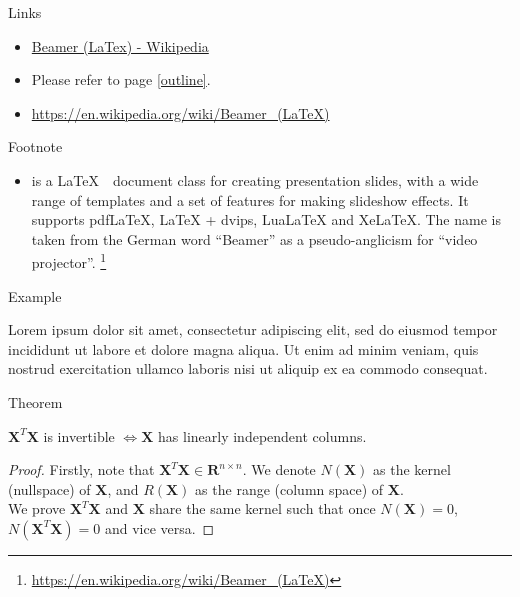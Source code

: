 \documentclass{beamer}
\begin{document}
\begin{frame}{Links}
    \begin{itemize}
        \item \href{https://en.wikipedia.org/wiki/Beamer_(LaTeX)}{Beamer (LaTex) - Wikipedia}
        \item Please refer to page \ref{outline}.
        \item \url{https://en.wikipedia.org/wiki/Beamer_(LaTeX)}
    \end{itemize}
\end{frame}

\begin{frame}{Footnote}
    \begin{itemize}
        \item {} is a \LaTeX~~document class for creating presentation slides, with a wide range of templates and a set of features for making slideshow effects. It supports pdfLaTeX, LaTeX + dvips, LuaLaTeX and XeLaTeX. The name is taken from the German word ``Beamer'' as a pseudo-anglicism for ``video projector''. \footnote{\href{https://en.wikipedia.org/wiki/Beamer_(LaTeX)}{https://en.wikipedia.org/wiki/Beamer\_(LaTeX)}}
    \end{itemize}
\end{frame}


\begin{frame}{Example}
    \begin{example}
        Lorem ipsum dolor sit amet, consectetur adipiscing elit, sed do eiusmod tempor incididunt ut labore et dolore magna aliqua. Ut enim ad minim veniam, quis nostrud exercitation ullamco laboris nisi ut aliquip ex ea commodo consequat.
    \end{example}
\end{frame}

\begin{frame}{Theorem}
    \begin{theorem}
        $\mathbf{X}^T\mathbf{X}$ is invertible $\iff \mathbf{X}$ has linearly independent columns.
    \end{theorem}\pause
    \vspace{0.2in}
    \begin{proof}
        Firstly, note that $\mathbf{X}^T\mathbf{X} \in \mathbf{R}^{n \times n}$. We denote $N(\mathbf{X})$ as the kernel (nullspace) of $\mathbf{X}$, and $R(\mathbf{X})$ as the range (column space) of $\mathbf{X}$. \\
        We prove $\mathbf{X}^T\mathbf{X}$ and $\mathbf{X}$ share the same kernel such that once $N(\mathbf{X}) = 0$, $N(\mathbf{X}^T\mathbf{X}) = 0$ and vice versa.
    \end{proof}
\end{frame}
\end{document}
